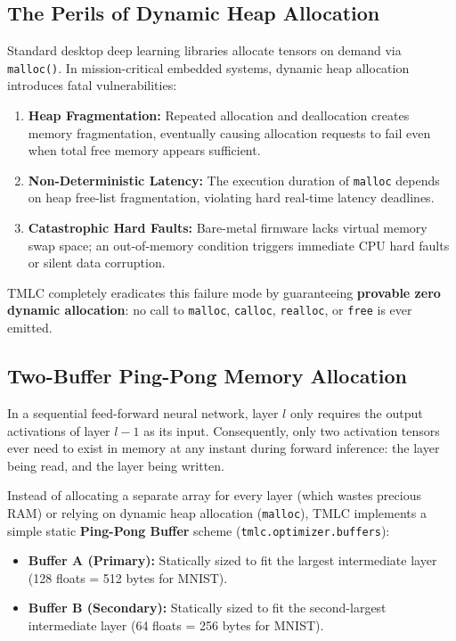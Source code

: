 \documentclass[11pt,a4paper]{article}
\begin{document}
\subsection{The Perils of Dynamic Heap Allocation}
Standard desktop deep learning libraries allocate tensors on demand via \texttt{malloc()}. In mission-critical embedded systems, dynamic heap allocation introduces fatal vulnerabilities:
\begin{enumerate}
    \item \textbf{Heap Fragmentation:} Repeated allocation and deallocation creates memory fragmentation, eventually causing allocation requests to fail even when total free memory appears sufficient.
    \item \textbf{Non-Deterministic Latency:} The execution duration of \texttt{malloc} depends on heap free-list fragmentation, violating hard real-time latency deadlines.
    \item \textbf{Catastrophic Hard Faults:} Bare-metal firmware lacks virtual memory swap space; an out-of-memory condition triggers immediate CPU hard faults or silent data corruption.
\end{enumerate}

TMLC completely eradicates this failure mode by guaranteeing \textbf{provable zero dynamic allocation}: no call to \texttt{malloc}, \texttt{calloc}, \texttt{realloc}, or \texttt{free} is ever emitted.

\subsection{Two-Buffer Ping-Pong Memory Allocation}
In a sequential feed-forward neural network, layer $l$ only requires the output activations of layer $l-1$ as its input. Consequently, only two activation tensors ever need to exist in memory at any instant during forward inference: the layer being read, and the layer being written.

Instead of allocating a separate array for every layer (which wastes precious RAM) or relying on dynamic heap allocation (\texttt{malloc}), TMLC implements a simple static \textbf{Ping-Pong Buffer} scheme (\texttt{tmlc.optimizer.buffers}):
\begin{itemize}[leftmargin=*]
    \item \textbf{Buffer A (Primary):} Statically sized to fit the largest intermediate layer (128 floats = 512 bytes for MNIST).
    \item \textbf{Buffer B (Secondary):} Statically sized to fit the second-largest intermediate layer (64 floats = 256 bytes for MNIST).
\end{itemize}
\end{document}
